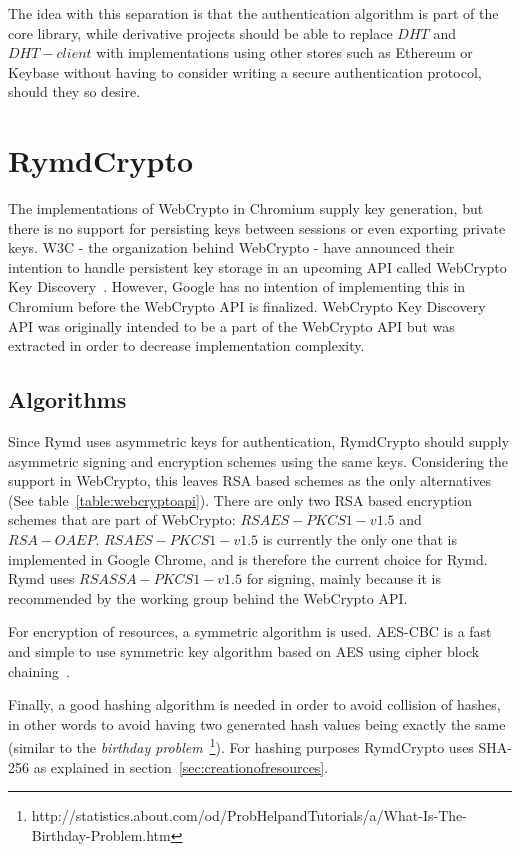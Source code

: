 The idea with this separation is that the authentication algorithm is part of the core library, while derivative projects should be able to replace $DHT$ and $DHT-client$ with implementations using other stores such as Ethereum or Keybase without having to consider writing a secure authentication protocol, should they so desire.

\section{RymdCrypto}
\label{sec:cryptography}
The implementations of WebCrypto in Chromium supply key generation, but there is no support for persisting keys between sessions or even exporting private keys. W3C - the organization behind WebCrypto - have announced their intention to handle persistent key storage in an upcoming API called WebCrypto Key Discovery~\cite{WebCryptoKeyDiscovery:Online}. However, Google has no intention of implementing this in Chromium before the WebCrypto API is finalized. WebCrypto Key Discovery API was originally intended to be a part of the WebCrypto API but was extracted in order to decrease implementation complexity.

\subsection{Algorithms}
Since Rymd uses asymmetric keys for authentication, RymdCrypto should supply asymmetric signing and encryption schemes using the same keys. Considering the support in WebCrypto, this leaves RSA based schemes as the only alternatives (See table~\ref{table:webcryptoapi}). There are only two RSA based encryption schemes that are part of WebCrypto: $RSAES-PKCS1-v1.5$ and $RSA-OAEP$. $RSAES-PKCS1-v1.5$ is currently the only one that is implemented in Google Chrome, and is therefore the current choice for Rymd.  Rymd uses $RSASSA-PKCS1-v1.5$ for signing, mainly because it is recommended by the working group behind the WebCrypto API.

For encryption of resources, a symmetric algorithm is used. AES-CBC is a fast and simple to use symmetric key algorithm based on AES using cipher block chaining~\cite{AESISFAST:Online}.

Finally, a good hashing algorithm is needed in order to avoid collision of hashes, in other words to avoid having two generated hash values being exactly the same (similar to the \emph{birthday problem}~\footnote{http://statistics.about.com/od/ProbHelpandTutorials/a/What-Is-The-Birthday-Problem.htm}). For hashing purposes RymdCrypto uses SHA-256 as explained in section~\ref{sec:creationofresources}.


